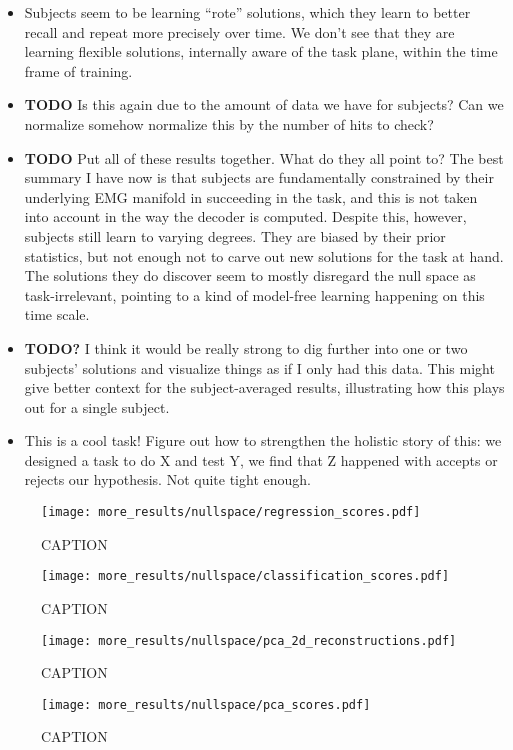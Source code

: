 \documentclass[../main.tex]{subfiles}
\begin{document}
\begin{itemize}
  \item Subjects seem to be learning ``rote'' solutions, which they learn to better recall and repeat more precisely over time. We don't see that they are learning flexible solutions, internally aware of the task plane, within the time frame of training.
  \item \textbf{TODO} Is this again due to the amount of data we have for subjects? Can we normalize somehow normalize this by the number of hits to check?
  \item \textbf{TODO} Put all of these results together. What do they all point to? The best summary I have now is that subjects are fundamentally constrained by their underlying EMG manifold in succeeding in the task, and this is not taken into account in the way the decoder is computed. Despite this, however, subjects still learn to varying degrees. They are biased by their prior statistics, but not enough not to carve out new solutions for the task at hand. The solutions they do discover seem to mostly disregard the null space as task-irrelevant, pointing to a kind of model-free learning happening on this time scale.
  \item \textbf{TODO?} I think it would be really strong to dig further into one or two subjects' solutions and visualize things as if I only had this data. This might give better context for the subject-averaged results, illustrating how this plays out for a single subject.
  \item This is a cool task! Figure out how to strengthen the holistic story of this: we designed a task to do X and test Y, we find that Z happened with accepts or rejects our hypothesis. Not quite tight enough.
\end{itemize}


\begin{figure}[tph]
  \centering
    \texttt{[image: more\_results/nullspace/regression\_scores.pdf]}
    \caption[regression scores]{CAPTION}\label{fig:regression_scores}
\end{figure}

\begin{figure}[tph]
  \centering
    \texttt{[image: more\_results/nullspace/classification\_scores.pdf]}
    \caption[classification scores]{CAPTION}\label{fig:classification_scores}
\end{figure}

\begin{figure}[tph]
  \centering
    \texttt{[image: more\_results/nullspace/pca\_2d\_reconstructions.pdf]}
    \caption[PCA projections of null space into two dimensions]{CAPTION}\label{fig:pca_null}
\end{figure}

\begin{figure}[tph]
  \centering
    \texttt{[image: more\_results/nullspace/pca\_scores.pdf]}
    \caption[Classification scores of PCA reconstructions]{CAPTION}\label{fig:pca_scores}
\end{figure}



\end{document}

